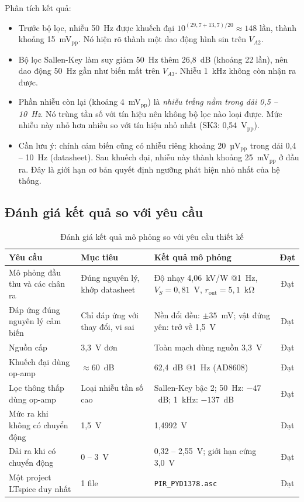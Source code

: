 Phân tích kết quả:
\begin{itemize}
  \item Trước bộ lọc, nhiễu 50~Hz được khuếch đại $10^{(29{,}7+13{,}7)/20} \approx 148$ lần, thành khoảng 15~mV$_\text{pp}$. Nó hiện rõ thành một dao động hình sin trên $V_{A2}$.
  \item Bộ lọc Sallen-Key làm suy giảm 50~Hz thêm 26,8~dB (khoảng 22 lần), nên dao động 50~Hz gần như biến mất trên $V_{A3}$. Nhiễu 1~kHz không còn nhận ra được.
  \item Phần nhiễu còn lại (khoảng 4~mV$_\text{pp}$) là \emph{nhiễu trắng nằm trong dải 0,5 -- 10~Hz}. Nó trùng tần số với tín hiệu nên không bộ lọc nào loại được. Mức nhiễu này nhỏ hơn nhiều so với tín hiệu nhỏ nhất (SK3: 0,54~V$_\text{pp}$).
  \item Cần lưu ý: chính cảm biến cũng có nhiễu riêng khoảng 20~µV$_\text{pp}$ trong dải 0,4 -- 10~Hz (datasheet). Sau khuếch đại, nhiễu này thành khoảng 25~mV$_\text{pp}$ ở đầu ra. Đây là giới hạn cơ bản quyết định ngưỡng phát hiện nhỏ nhất của hệ thống.
\end{itemize}

\subsection{Đánh giá kết quả so với yêu cầu}

\begin{table}[!htb]
\centering
\caption{Đánh giá kết quả mô phỏng so với yêu cầu thiết kế}
\label{tab:danhgia}
\small
\begin{tabularx}{\textwidth}{@{}p{4.3cm}p{3.4cm}Lc@{}}
\toprule
\textbf{Yêu cầu} & \textbf{Mục tiêu} & \textbf{Kết quả mô phỏng} & \textbf{Đạt} \\ \midrule
Mô phỏng đầu thu \PYD{} và các chân ra & Đúng nguyên lý, khớp datasheet & Độ nhạy 4,06~kV/W @1~Hz, $V_S = 0{,}81$~V, $r_\text{out} = 5{,}1$~kΩ & Đạt \\
Đáp ứng đúng nguyên lý cảm biến & Chỉ đáp ứng với thay đổi, vi sai & Nền đổi đều: $\pm35$~mV; vật đứng yên: trở về 1,5~V & Đạt \\
Nguồn cấp & 3,3~V đơn & Toàn mạch dùng nguồn 3,3~V & Đạt \\
Khuếch đại dùng op-amp & $\approx 60$~dB & 62,4~dB @1~Hz (AD8608) & Đạt \\
Lọc thông thấp dùng op-amp & Loại nhiễu tần số cao & Sallen-Key bậc 2; 50~Hz: $-47$~dB; 1~kHz: $-137$~dB & Đạt \\
Mức ra khi không có chuyển động & 1,5~V & 1,4992~V & Đạt \\
Dải ra khi có chuyển động & 0 -- 3~V & 0,32 -- 2,55~V; giới hạn cứng 3,0~V & Đạt \\
Một project LTspice duy nhất & 1 file & \texttt{PIR\_PYD1378.asc} & Đạt \\
\bottomrule
\end{tabularx}
\end{table}
